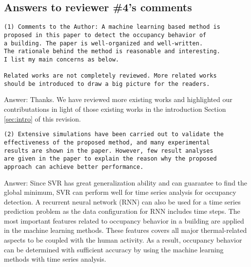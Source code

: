 

\subsection{Answers to reviewer \#4's comments}
\begin{verbatim}
(1) Comments to the Author: A machine learning based method is
proposed in this paper to detect the occupancy behavior of
a building. The paper is well-organized and well-written.
The rationale behind the method is reasonable and interesting.
I list my main concerns as below.

Related works are not completely reviewed. More related works
should be introduced to draw a big picture for the readers.
\end{verbatim}

Answer: Thanks. We have reviewed more existing works and highlighted
our contributations in light of those existing works in the introduction
Section \ref{sec:intro} of this revision.



\begin{verbatim}
(2) Extensive simulations have been carried out to validate the
effectiveness of the proposed method, and many experimental
results are shown in the paper. However, few result analyses
are given in the paper to explain the reason why the proposed
approach can achieve better performance.
\end{verbatim}

Answer: Since SVR has great generalization ability and can guarantee
to find the global minimum, SVR can perform well for time series
analysis for occupancy detection. A recurrent neural network (RNN) can
also be used for a time series prediction problem as the data
configuration for RNN includes time steps. The most important features
related to occupancy behavior in a building are applied in the machine
learning methods. These features covers all major thermal-related
aspects to be coupled with the human activity. As a result, occupancy
behavior can be determined with sufficient accuracy by using the
machine learning methods with time series analysis.

